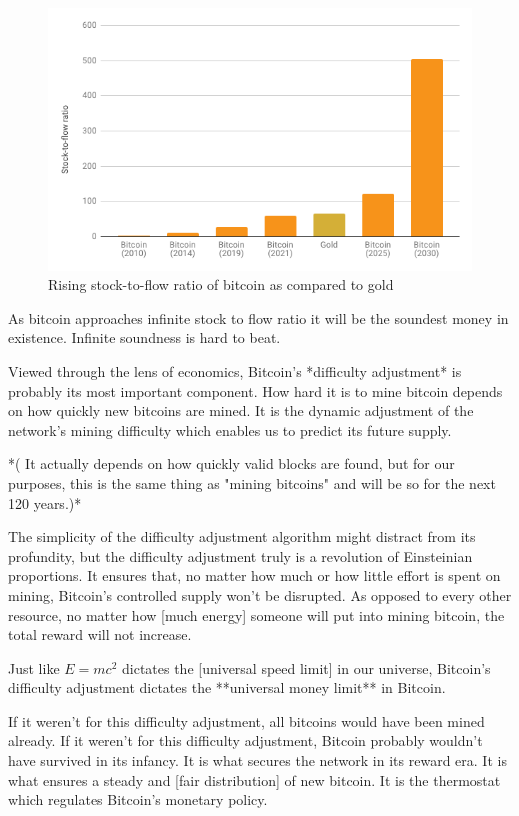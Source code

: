 \begin{figure}
  \includegraphics{assets/images/soundness-over-time.png}
  \caption{Rising stock-to-flow ratio of bitcoin as compared to gold}
  \label{fig:soundness-over-time}
\end{figure}

As bitcoin approaches infinite stock to flow ratio it will be the
soundest money in existence. Infinite soundness is hard to beat.

Viewed through the lens of economics, Bitcoin's *difficulty adjustment*
is probably its most important component. How hard it is to mine bitcoin
depends on how quickly new bitcoins are mined\*. It is the dynamic
adjustment of the network's mining difficulty which enables us to
predict its future supply.

*(\* It actually depends on how quickly valid blocks are found, but for
our purposes, this is the same thing as "mining bitcoins" and will be so
for the next 120 years.)*

The simplicity of the difficulty adjustment algorithm might distract
from its profundity, but the difficulty adjustment truly is a revolution
of Einsteinian proportions. It ensures that, no matter how much or how
little effort is spent on mining, Bitcoin's controlled supply won't be
disrupted. As opposed to every other resource, no matter how [much
energy] someone will put into mining bitcoin, the total reward will not
increase.

Just like $E=mc^2$ dictates the [universal speed limit] in our universe,
Bitcoin's difficulty adjustment dictates the **universal money limit**
in Bitcoin.

If it weren't for this difficulty adjustment, all bitcoins would have
been mined already. If it weren't for this difficulty adjustment,
Bitcoin probably wouldn't have survived in its infancy. It is what
secures the network in its reward era. It is what ensures a steady and
[fair distribution] of new bitcoin. It is the thermostat which regulates
Bitcoin's monetary policy.

